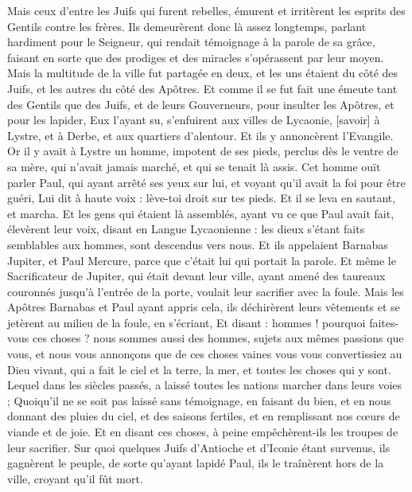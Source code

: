 \begin{multicols}{2}
Mais ceux d'entre les Juifs qui furent rebelles, émurent et irritèrent les esprits des Gentils contre les frères.
Ils demeurèrent donc là assez longtemps, parlant hardiment pour le Seigneur, qui rendait témoignage à la parole de sa grâce, faisant en sorte que des prodiges et des miracles s'opérassent par leur moyen.
Mais la multitude de la ville fut partagée en deux, et les uns étaient du côté des Juifs, et les autres du côté des Apôtres.
Et comme il se fut fait une émeute tant des Gentils que des Juifs, et de leurs Gouverneurs, pour insulter les Apôtres, et pour les lapider,
Eux l'ayant su, s'enfuirent aux villes de Lycaonie, [savoir] à Lystre, et à Derbe, et aux quartiers d'alentour.
Et ils y annoncèrent l'Evangile.
Or il y avait à Lystre un homme, impotent de ses pieds, perclus dès le ventre de sa mère, qui n'avait jamais marché, et qui se tenait là assis.
Cet homme ouït parler Paul, qui ayant arrêté ses yeux sur lui, et voyant qu'il avait la foi pour être guéri,
Lui dit à haute voix : lève-toi droit sur tes pieds. Et il se leva en sautant, et marcha.
Et les gens qui étaient là assemblés, ayant vu ce que Paul avait fait, élevèrent leur voix, disant en Langue Lycaonienne : les dieux s'étant faits semblables aux hommes, sont descendus vers nous.
Et ils appelaient Barnabas Jupiter, et Paul Mercure, parce que c'était lui qui portait la parole.
Et même le Sacrificateur de Jupiter, qui était devant leur ville, ayant amené des taureaux couronnés jusqu'à l'entrée de la porte, voulait leur sacrifier avec la foule.
Mais les Apôtres Barnabas et Paul ayant appris cela, ils déchirèrent leurs vêtements et se jetèrent au milieu de la foule, en s'écriant,
Et disant : hommes ! pourquoi faites-vous ces choses ? nous sommes aussi des hommes, sujets aux mêmes passions que vous, et nous vous annonçons que de ces choses vaines vous vous convertissiez au Dieu vivant, qui a fait le ciel et la terre, la mer, et toutes les choses qui y sont.
Lequel dans les siècles passés, a laissé toutes les nations marcher dans leurs voies ;
Quoiqu'il ne se soit pas laissé sans témoignage, en faisant du bien, et en nous donnant des pluies du ciel, et des saisons fertiles, et en remplissant nos cœurs de viande et de joie.
Et en disant ces choses, à peine empêchèrent-ils les troupes de leur sacrifier.
Sur quoi quelques Juifs d'Antioche et d'Iconie étant survenus, ils gagnèrent le peuple, de sorte qu'ayant lapidé Paul, ils le traînèrent hors de la ville, croyant qu'il fût mort.

\end{multicols}
